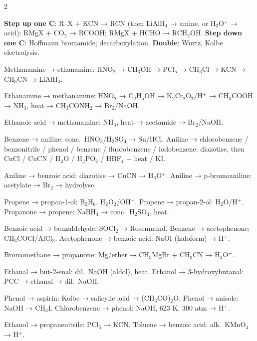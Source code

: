 \documentclass[9pt,a4paper]{extarticle}
\begin{document}
\begin{multicols}{2}
{\scriptsize
\textbf{Step up one C}: R--X + KCN → RCN (then LiAlH$_4$ → amine, or H$_3$O$^+$ → acid); RMgX + CO$_2$ → RCOOH; RMgX + HCHO → RCH$_2$OH. \textbf{Step down one C}: Hoffmann bromamide; decarboxylation. \textbf{Double}: Wurtz, Kolbe electrolysis.
\begin{fl}
\item Methanamine → ethanamine: HNO$_2$ → CH$_3$OH → PCl$_5$ → CH$_3$Cl → KCN → CH$_3$CN → LiAlH$_4$.
\item Ethanamine → methanamine: HNO$_2$ → C$_2$H$_5$OH → K$_2$Cr$_2$O$_7$/H$^+$ → CH$_3$COOH → NH$_3$, heat → CH$_3$CONH$_2$ → Br$_2$/NaOH.
\item Ethanoic acid → methanamine: NH$_3$, heat → acetamide → Br$_2$/NaOH.
\item Benzene → aniline: conc.\ HNO$_3$/H$_2$SO$_4$ → Sn/HCl. Aniline → chlorobenzene / benzonitrile / phenol / benzene / fluorobenzene / iodobenzene: diazotise, then CuCl / CuCN / H$_2$O / H$_3$PO$_2$ / HBF$_4$ + heat / KI.
\item Aniline → benzoic acid: diazotise → CuCN → H$_3$O$^+$. Aniline → p-bromoaniline: acetylate → Br$_2$ → hydrolyse.
\item Propene → propan-1-ol: B$_2$H$_6$, H$_2$O$_2$/OH$^-$. Propene → propan-2-ol: H$_2$O/H$^+$. Propanone → propene: NaBH$_4$ → conc.\ H$_2$SO$_4$, heat.
\item Benzoic acid → benzaldehyde: SOCl$_2$ → Rosenmund. Benzene → acetophenone: CH$_3$COCl/AlCl$_3$. Acetophenone → benzoic acid: NaOI (haloform) → H$^+$.
\item Bromomethane → propanone: Mg/ether → CH$_3$MgBr + CH$_3$CN → H$_3$O$^+$.
\item Ethanal → but-2-enal: dil.\ NaOH (aldol), heat. Ethanol → 3-hydroxybutanal: PCC → ethanal → dil.\ NaOH.
\item Phenol → aspirin: Kolbe → salicylic acid → (CH$_3$CO)$_2$O. Phenol → anisole: NaOH → CH$_3$I. Chlorobenzene → phenol: NaOH, 623 K, 300 atm → H$^+$.
\item Ethanol → propanenitrile: PCl$_5$ → KCN. Toluene → benzoic acid: alk.\ KMnO$_4$ → H$^+$.
\end{fl}\par}


\end{multicols}
\end{document}
